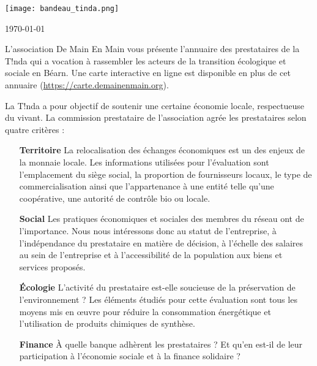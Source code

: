 
  \begin{center}
    \texttt{[image: bandeau\_tinda.png]}
  \end{center}
\today

    \vspace{.5cm}
    \noindent L’association De Main En Main vous présente l’annuaire des prestataires de la T!nda qui a
vocation à rassembler les acteurs de la transition écologique et sociale en Béarn. Une carte interactive en ligne
    est disponible en plus de cet annuaire (\url{https://carte.demainenmain.org}).
    \vspace{.5cm}

    \noindent La T!nda a pour objectif de soutenir une certaine économie locale, respectueuse du vivant. La commission prestataire de l'association agrée les prestataires selon quatre critères :
    \vspace{.2cm}
    \begin{itemize}
      \item[\textbf{Territoire}]  La relocalisation des échanges économiques est un des enjeux de la monnaie locale. 
        Les informations utilisées pour l'évaluation sont l’emplacement du siège social, la proportion de fournisseurs locaux, le
type de commercialisation ainsi que l’appartenance à une entité telle qu’une coopérative, une autorité de contrôle bio
ou locale.
    \vspace{.2cm}
\item[\textbf{Social}] Les pratiques économiques et sociales des membres du réseau ont de l'importance. Nous nous intéressons donc au statut de
l’entreprise, à l’indépendance du prestataire en matière de décision, à l’échelle des salaires au sein de l’entreprise
et à l’accessibilité de la population aux biens et services proposés.
    \vspace{.2cm}
\item[\textbf{Écologie}] L’activité du prestataire est-elle soucieuse de la préservation de l'environnement ? Les éléments étudiés pour cette
évaluation sont tous les moyens mis en œuvre pour réduire la consommation énergétique et l’utilisation de produits
chimiques de synthèse.
    \vspace{.2cm}
\item[\textbf{Finance}] À quelle banque adhèrent les prestataires ? Et qu’en est-il de leur participation à l’économie sociale et à la
finance solidaire ?
    \end{itemize}


    \vspace{.5cm}

